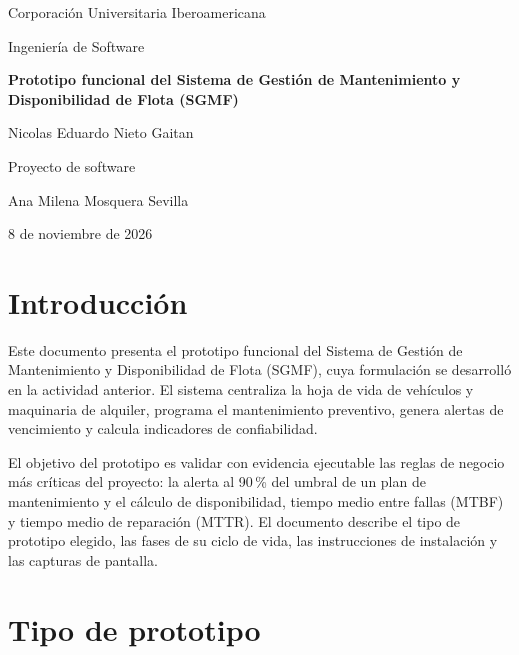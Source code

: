 \documentclass[12pt,letterpaper]{article}
\begin{document}
\begin{titlepage}
  \centering
  \vspace*{2cm}
  {\large Corporación Universitaria Iberoamericana\par}
  {\large Ingeniería de Software\par}
  \vspace{2.5cm}
  {\Large\bfseries Prototipo funcional del Sistema de Gestión de Mantenimiento y Disponibilidad de Flota (SGMF)\par}
  \vspace{2.5cm}
  Nicolas Eduardo Nieto Gaitan\par
  \vspace{2cm}
  Proyecto de software\par
  Ana Milena Mosquera Sevilla\par
  \vspace{2cm}
  8 de noviembre de 2026\par
\end{titlepage}

\tableofcontents
\newpage

\section{Introducción}

Este documento presenta el prototipo funcional del Sistema de Gestión de Mantenimiento y Disponibilidad de Flota (SGMF), cuya formulación se desarrolló en la actividad anterior. El sistema centraliza la hoja de vida de vehículos y maquinaria de alquiler, programa el mantenimiento preventivo, genera alertas de vencimiento y calcula indicadores de confiabilidad.

El objetivo del prototipo es validar con evidencia ejecutable las reglas de negocio más críticas del proyecto: la alerta al 90\,\% del umbral de un plan de mantenimiento y el cálculo de disponibilidad, tiempo medio entre fallas (MTBF) y tiempo medio de reparación (MTTR). El documento describe el tipo de prototipo elegido, las fases de su ciclo de vida, las instrucciones de instalación y las capturas de pantalla.

\section{Tipo de prototipo}
\end{document}
